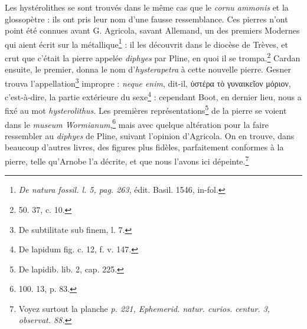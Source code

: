 \documentclass[a4paper, 11pt, oneside, polutonikogreek, french]{article}
\begin{document}
Les hystérolithes se sont trouvés dans le même cas que le \emph{cornu ammonis} et la glossopètre : ils ont pris leur nom d'une fausse ressemblance. Ces pierres n'ont point été connues avant G. Agricola, savant Allemand, un des premiers Modernes qui aient écrit sur la métallique\footnote{\emph{De natura fossil. l. 5, pag. 263}, édit. Basil. 1546, in-fol.} : il les découvrit dans le diocèse de Trèves, et crut que c'était la pierre appelée \emph{diphyes} par Pline, en quoi il se trompa.\footnote{50. 37, c. 10.} Cardan ensuite, le premier, donna le nom d'\emph{hysterapetra} à cette nouvelle pierre. Gesner trouva l'appellation\footnote{De subtilitate sub finem, l. 7.} impropre : \emph{neque enim}, dit-il, ὑστέρα τὸ γυναικεῖον μόριον, c'est-à-dire, la partie extérieure du sexe\footnote{De lapidum fig. c. 12, f. v. 147.} : cependant Boot, en dernier lieu, nous a fixé au mot \emph{hysterolithus}. Les premières représentations\footnote{De lapidib. lib. 2, cap. 225.} de la pierre se voient dans le \emph{museum Wormianum},\footnote{100. 13, p. 83.} mais avec quelque altération pour la faire ressembler au \emph{diphyes} de Pline, suivant l'opinion d'Agricola. On en trouve, dans beaucoup d'autres livres, des figures plus fidèles, parfaitement conformes à la pierre, telle qu'Arnobe l'a décrite, et que nous l'avons ici dépeinte.\footnote{Voyez surtout la planche \emph{p. 221, Ephemerid. natur. curios. centur. 3, observat. 88.}}
\end{document}
